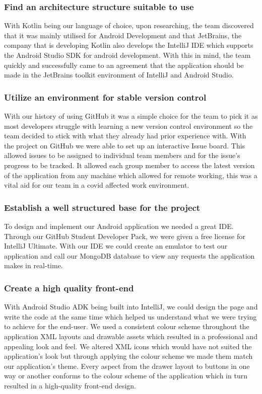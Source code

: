 \subsubsection {Find an architecture structure suitable to use}
With Kotlin being our language of choice, upon researching, the team discovered that it was mainly utilised for Android Development and that JetBrains, the company that is developing Kotlin also develops the IntelliJ IDE which supports the Android Studio SDK for android development. With this in mind, the team quickly and successfully came to an agreement that the application should be made in the JetBrains toolkit environment of IntelliJ and Android Studio.
\subsubsection {Utilize an environment for stable version control}
With our history of using GitHub it was a simple choice for the team to pick it as most developers struggle with learning a new version control environment so the team decided to stick with what they already had prior experience with. With the project on GitHub we were able to set up an interactive Issue board. This allowed issues to be assigned to individual team members and for the issue's progress to be tracked. It allowed each group member to access the latest version of the application from any machine which allowed for remote working, this was a vital aid for our team in a covid affected work environment.
\subsubsection {Establish a well structured base for the project}
To design and implement our Android application we needed a great IDE. Through our GitHub Student Developer Pack, we were given a free license for IntelliJ Ultimate. With our IDE we could create an emulator to test our application and call our MongoDB database to view any requests the application makes in real-time.
\subsubsection {Create a high quality front-end}
With Android Studio ADK being built into IntelliJ, we could design the page and write the code at the same time which helped us understand what we were trying to achieve for the end-user. We used a consistent colour scheme throughout the application XML layouts and drawable assets which resulted in a professional and appealing look and feel. We altered XML icons which would have not suited the application's look but through applying the colour scheme we made them match our application's theme. Every aspect from the drawer layout to buttons in one way or another conforms to the colour scheme of the application which in turn resulted in a high-quality front-end design.

